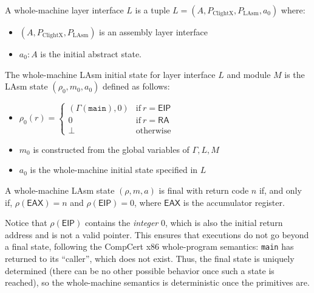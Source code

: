 \begin{definition} \label{def:whole-machine-layer}
A whole-machine layer interface $L$ is a tuple
$L = (A, P_{\mathrm{ClightX}}, P_{\mathrm{LAsm}}, a_0)$
where:
\begin{itemize}
\item $(A, P_{\mathrm{ClightX}}, P_{\mathrm{LAsm}})$ is an assembly layer interface
\item $a_0 : A$ is the initial abstract state.
\end{itemize}
\end{definition}

\begin{definition}
The whole-machine LAsm initial state for layer interface $L$ and module $M$ is
the LAsm state $(\rho_0, m_0, a_0)$ defined as follows:
\begin{itemize}
\item $\rho_0(r) = \left\{ \begin{array}{ll}
(\Gamma(\mathtt{main}), 0) & \text{if} ~ r = \mathsf{EIP} \\
0 & \text{if} ~ r = \mathsf{RA} \\
\bot & \text{otherwise}
\end{array}
\right. $
\item $m_0$ is constructed from the global variables of $\Gamma, L, M$
\item $a_0$ is the whole-machine initial state specified in $L$
\end{itemize}
\end{definition}

\begin{definition}
A whole-machine LAsm state $(\rho, m, a)$ is final with return code
$n$ if, and only if, $\rho(\mathsf{EAX}) = n$ and $\rho(\mathsf{EIP}) =
0$, where $\mathsf{EAX}$ is the accumulator register.
\end{definition}

Notice that $\rho(\mathsf{EIP})$ contains the \emph{integer} 0,
which is also the initial return address and is not a valid pointer.
This ensures that executions do not
go beyond a final state, following the CompCert x86 whole-program
semantics: \texttt{main} has returned to its ``caller'', which does
not exist. Thus, the final state is uniquely determined (there can be
no other possible behavior once such a state is reached), so the
whole-machine semantics is deterministic once the primitives are.

